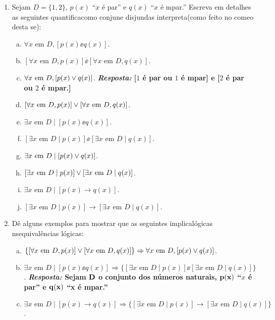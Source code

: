 \begin{enumerate}[{\bf 1.}]
\item Sejam $D=\{1,2\}$, $p(x)$ ``$x$ \'e par'' e $q(x)$ ``$x$ \'e \ih mpar.'' Escreva em detalhes as seguintes quantifica\coes como conjun\coes e disjun\coes  das interpreta\coes (como feito no come\cc o desta se\caoi):
\begin{enumerate}[a)]
\item $\forall x \textrm{ em } D, [p(x)\ee q(x)]$.
\item $[\forall x \textrm{ em } D, p(x)]\ee[\forall x \textrm{ em } D, q(x)]$.
\item $\forall x \textrm{ em } D, [p(x)\vee q(x)]$. {\bf{\it Resposta:} [$1$ \'e par ou $1$ \'e \ih mpar] e [$2$ \'e par ou $2$ \'e \ih mpar.]}
\item $[\forall x \textrm{ em } D, p(x)]\vee[\forall x \textrm{ em } D, q(x)]$.
\item $\exists x \textrm{ em } D \mid  [p(x)\ee q(x)]$.
\item $[\exists x \textrm{ em } D \mid  p(x)]\ee[\exists x \textrm{ em } D \mid  q(x)]$.
\item $\exists x \textrm{ em } D \mid  [p(x)\vee q(x)]$.
\item $[\exists x \textrm{ em } D \mid  p(x)]\vee[\exists x \textrm{ em } D \mid  q(x)]$.
\item $\exists x \textrm{ em } D \mid  [p(x)\to q(x)]$.
\item $[\exists x \textrm{ em } D \mid  p(x)]\to[\exists x \textrm{ em } D \mid  q(x)]$.
\end{enumerate}

\item D\^e alguns exemplos para mostrar que as seguintes implica\coes l\'ogicas n\ao s\ao equival\^encias l\'ogicas:
\begin{enumerate}[a)]
\item $\{[\forall x \textrm{ em } D, p(x)]\vee[\forall x \textrm{ em } D, q(x)]\}\Rightarrow \forall x \textrm{ em } D, [p(x)\vee q(x)]$.
\item $\exists x \textrm{ em } D \mid  [p(x)\ee q(x)]\Rightarrow\{[\exists x \textrm{ em } D \mid  p(x)]\ee[\exists x \textrm{ em } D \mid  q(x)]\}$. {\bf{\it Resposta:} Sejam ${\bf D}$ o conjunto dos n\'umeros naturais, ${\bf p(x)}$ ``$x$ \'e par'' e ${\bf q(x)}$ ``x \'e \ih mpar.''}
\item $\exists x \textrm{ em } D \mid  [p(x)\to q(x)]\Rightarrow\{[\exists x \textrm{ em } D \mid  p(x)]\to[\exists x \textrm{ em } D \mid  q(x)]\}$.
\end{enumerate}


\end{enumerate}

